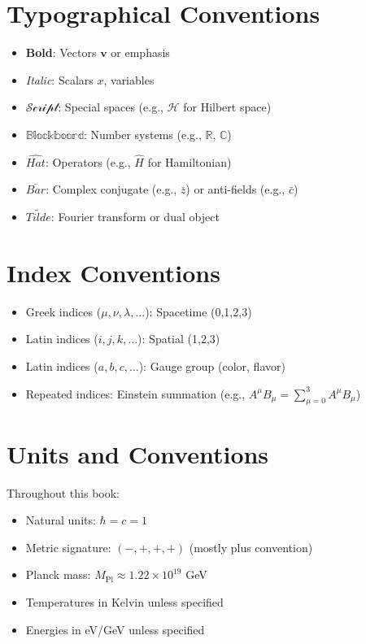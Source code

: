 \section{Typographical Conventions}

\begin{itemize}
\item \textbf{Bold}: Vectors $\mathbf{v}$ or emphasis
\item \textit{Italic}: Scalars $x$, variables
\item $\mathcal{Script}$: Special spaces (e.g., $\mathcal{H}$ for Hilbert space)
\item $\mathbb{Blackboard}$: Number systems (e.g., $\mathbb{R}$, $\mathbb{C}$)
\item $\hat{Hat}$: Operators (e.g., $\hat{H}$ for Hamiltonian)
\item $\bar{Bar}$: Complex conjugate (e.g., $\bar{z}$) or anti-fields (e.g., $\bar{c}$)
\item $\tilde{Tilde}$: Fourier transform or dual object
\end{itemize}

\section{Index Conventions}

\begin{itemize}
\item Greek indices ($\mu, \nu, \lambda, \ldots$): Spacetime (0,1,2,3)
\item Latin indices ($i, j, k, \ldots$): Spatial (1,2,3)
\item Latin indices ($a, b, c, \ldots$): Gauge group (color, flavor)
\item Repeated indices: Einstein summation (e.g., $A^\mu B_\mu = \sum_{\mu=0}^3 A^\mu B_\mu$)
\end{itemize}

\section{Units and Conventions}

Throughout this book:
\begin{itemize}
\item Natural units: $\hbar = c = 1$
\item Metric signature: $(-, +, +, +)$ (mostly plus convention)
\item Planck mass: $M_{\text{Pl}} \approx 1.22 \times 10^{19}$ GeV
\item Temperatures in Kelvin unless specified
\item Energies in eV/GeV unless specified
\end{itemize}